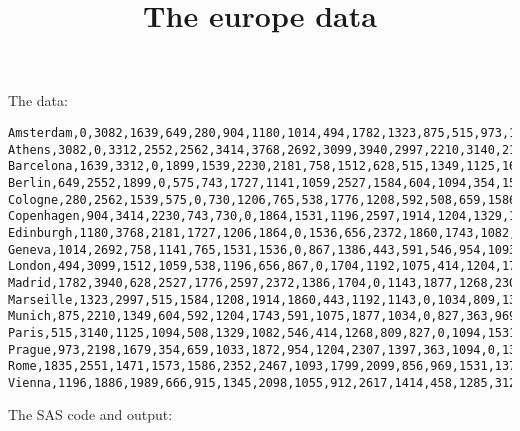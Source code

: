 \documentclass{article}
\title{The europe data}
\begin{document}
\maketitle
The data:
\begin{verbatim}
Amsterdam,0,3082,1639,649,280,904,1180,1014,494,1782,1323,875,515,973,1835,1196
Athens,3082,0,3312,2552,2562,3414,3768,2692,3099,3940,2997,2210,3140,2198,2551,1886
Barcelona,1639,3312,0,1899,1539,2230,2181,758,1512,628,515,1349,1125,1679,1471,1989
Berlin,649,2552,1899,0,575,743,1727,1141,1059,2527,1584,604,1094,354,1573,666
Cologne,280,2562,1539,575,0,730,1206,765,538,1776,1208,592,508,659,1586,915
Copenhagen,904,3414,2230,743,730,0,1864,1531,1196,2597,1914,1204,1329,1033,2352,1345
Edinburgh,1180,3768,2181,1727,1206,1864,0,1536,656,2372,1860,1743,1082,1872,2467,2098
Geneva,1014,2692,758,1141,765,1531,1536,0,867,1386,443,591,546,954,1093,1055
London,494,3099,1512,1059,538,1196,656,867,0,1704,1192,1075,414,1204,1799,912
Madrid,1782,3940,628,2527,1776,2597,2372,1386,1704,0,1143,1877,1268,2307,2099,2617
Marseille,1323,2997,515,1584,1208,1914,1860,443,1192,1143,0,1034,809,1397,856,1414
Munich,875,2210,1349,604,592,1204,1743,591,1075,1877,1034,0,827,363,969,458
Paris,515,3140,1125,1094,508,1329,1082,546,414,1268,809,827,0,1094,1531,1285
Prague,973,2198,1679,354,659,1033,1872,954,1204,2307,1397,363,1094,0,1370,312
Rome,1835,2551,1471,1573,1586,2352,2467,1093,1799,2099,856,969,1531,1370,0,1168
Vienna,1196,1886,1989,666,915,1345,2098,1055,912,2617,1414,458,1285,312,1168,0
\end{verbatim}
The SAS code and output:
\end{document}
